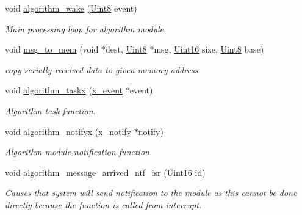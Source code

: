 \begin{DoxyCompactItemize}
void \hyperlink{a00038_a42ed16c7ef20e0c0031fe7ba7ae377b3}{algorithm\+\_\+wake} (\hyperlink{a00072_af84840501dec18061d18a68c162a8fa2}{Uint8} event)
\begin{DoxyCompactList}\small\item\em Main processing loop for algorithm module. \end{DoxyCompactList}\item 
void \hyperlink{a00038_a126f3d78a95341a19a3e862e57357952}{msg\+\_\+to\+\_\+mem} (void $\ast$dest, \hyperlink{a00072_af84840501dec18061d18a68c162a8fa2}{Uint8} $\ast$msg, \hyperlink{a00072_a59a9f6be4562c327cbfb4f7e8e18f08b}{Uint16} size, \hyperlink{a00072_af84840501dec18061d18a68c162a8fa2}{Uint8} base)
\begin{DoxyCompactList}\small\item\em copy serially received data to given memory address \end{DoxyCompactList}\item 
void \hyperlink{a00038_a1d182ae18a9176c2a1e28cc654dc0e43}{algorithm\+\_\+taskx} (\hyperlink{a00036_de/d37/a00849}{x\+\_\+event} $\ast$event)
\begin{DoxyCompactList}\small\item\em Algorithm task function. \end{DoxyCompactList}\item 
void \hyperlink{a00038_a93269cdec3e21934aa9395440a2de605}{algorithm\+\_\+notifyx} (\hyperlink{a00036_df/d4c/a00851}{x\+\_\+notify} $\ast$notify)
\begin{DoxyCompactList}\small\item\em Algorithm module notification function. \end{DoxyCompactList}\item 
void \hyperlink{a00038_a85471d58eae93d5d7e7e2b52e2b915d3}{algorithm\+\_\+message\+\_\+arrived\+\_\+ntf\+\_\+isr} (\hyperlink{a00072_a59a9f6be4562c327cbfb4f7e8e18f08b}{Uint16} id)
\begin{DoxyCompactList}\small\item\em Causes that system will send notification to the module as this cannot be done directly because the function is called from interrupt. \end{DoxyCompactList}\end{DoxyCompactItemize}
